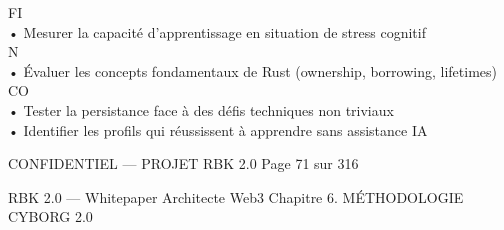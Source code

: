 \vspace{0.5em}
\vspace{0.5em}
\vspace{0.5em}
\vspace{0.5em}
FI\\
• Mesurer la capacité d’apprentissage en situation de stress cognitif\\
\vspace{0.5em}
\vspace{0.5em}
\vspace{0.5em}
\vspace{0.5em}
N\\
• Évaluer les concepts fondamentaux de Rust (ownership, borrowing, lifetimes)\\
CO\\
• Tester la persistance face à des défis techniques non triviaux\\
• Identifier les profils qui réussissent à apprendre sans assistance IA\\
\vspace{0.5em}
\vspace{0.5em}
\vspace{0.5em}
\vspace{0.5em}
\begin{confidential}CONFIDENTIEL — PROJET RBK 2.0                                              Page 71 sur 316\end{confidential}
RBK 2.0 — Whitepaper Architecte Web3                                                                                 Chapitre 6. MÉTHODOLOGIE CYBORG 2.0\\
\vspace{0.5em}
\vspace{0.5em}
